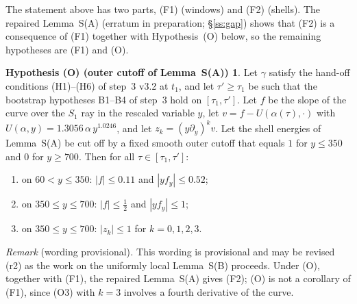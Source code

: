 \documentclass[11pt]{amsart}
\theoremstyle{definition}
\newtheorem*{hypO}{Hypothesis (O) (outer cutoff of Lemma~S(A))}
\theoremstyle{remark}
\begin{document}
The statement above has two parts, \textup{(F1)} (windows) and \textup{(F2)} (shells). The repaired Lemma~S(A) (erratum in preparation; \S\ref{ss:gap}) shows that \textup{(F2)} is a consequence of \textup{(F1)} together with Hypothesis~\textup{(O)} below, so the remaining hypotheses are \textup{(F1)} and \textup{(O)}.

\begin{hypO}
Let $\gamma$ satisfy the hand-off conditions \textup{(H1)--(H6)} of step~3 \textup{v3.2} at $t_1$, and let $\tau'\ge\tau_1$ be such that the bootstrap hypotheses \textup{B1--B4} of step~3 hold on $[\tau_1,\tau']$. Let $f$ be the slope of the curve over the $S_1$ ray in the rescaled variable $y$, let $v=f-U(\alpha(\tau),\cdot)$ with $U(\alpha,y)=1.3056\,\alpha\,y^{1.0246}$, and let $z_k=(y\partial_y)^kv$. Let the shell energies of Lemma~S\textup{(A)} be cut off by a fixed smooth outer cutoff that equals $1$ for $y\le350$ and $0$ for $y\ge700$. Then for all $\tau\in[\tau_1,\tau']$:
\begin{enumerate}[label=\textup{(O\arabic*)},leftmargin=2.6em,itemsep=1pt]
\item on $60<y\le350$: $|f|\le0.11$ and $|yf_y|\le0.52$;
\item on $350\le y\le700$: $|f|\le\frac12$ and $|yf_y|\le1$;
\item on $350\le y\le700$: $|z_k|\le1$ for $k=0,1,2,3$.
\end{enumerate}
\emph{Remark} \textup{(}wording provisional\textup{)}\emph{.} This wording is provisional and may be revised (r2) as the work on the uniformly local Lemma~S(B) proceeds. Under (O), together with (F1), the repaired Lemma~S(A) gives (F2); (O) is not a corollary of (F1), since (O3) with $k=3$ involves a fourth derivative of the curve.
\end{hypO}
\end{document}
